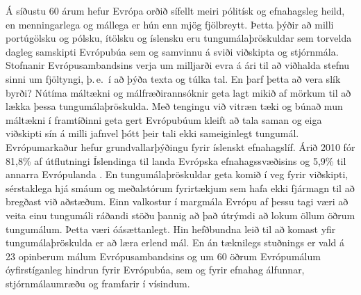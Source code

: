 \begin{multicols}{2}
Á síðustu 60 árum hefur Evrópa orðið sífellt meiri pólitísk og efnahagsleg heild, en menningarlega og mállega er hún enn mjög fjölbreytt. Þetta þýðir að milli portúgölsku og pólsku, ítölsku og íslensku eru tungumálaþröskuldar sem torvelda dagleg samskipti Evrópubúa sem og samvinnu á sviði viðskipta og stjórnmála. Stofnanir Evrópusambandsins verja um milljarði evra á ári til að viðhalda stefnu sinni um fjöltyngi, þ.\,e.~í að þýða texta og túlka tal. En þarf þetta að vera slík byrði? Nútíma máltækni og málfræðirannsóknir geta lagt mikið af mörkum til að lækka þessa tungumálaþröskulda. Með tengingu við vitræn tæki og búnað mun máltækni í framtíðinni geta gert Evrópubúum kleift að tala saman og eiga viðskipti sín á milli jafnvel þótt þeir tali ekki sameiginlegt tungumál.
Evrópumarkaður hefur grundvallarþýðingu fyrir íslenskt efnahagslíf. Árið 2010 fór 81,8\% af útflutningi Íslendinga til landa Evrópska efnahagssvæðisins og 5,9\% til annarra Evrópulanda \cite{hag3}. En tungumálaþröskuldar geta komið í veg fyrir viðskipti, sérstaklega hjá smáum og meðalstórum fyrirtækjum sem hafa ekki fjármagn til að bregðast við aðstæðum. Einn valkostur í margmála Evrópu af þessu tagi væri að veita einu tungumáli ráðandi stöðu þannig að það útrýmdi að lokum öllum öðrum tungumálum. Þetta væri óásættanlegt. Hin hefðbundna leið til að komast yfir tungumálaþröskulda er að læra erlend mál. En án tæknilegs stuðnings er vald á 23 opinberum málum Evrópusambandsins og um 60 öðrum Evrópumálum óyfirstíganleg hindrun fyrir Evrópubúa, sem og fyrir efnahag álfunnar, stjórnmálaumræðu og framfarir í vísindum.


\end{multicols}
